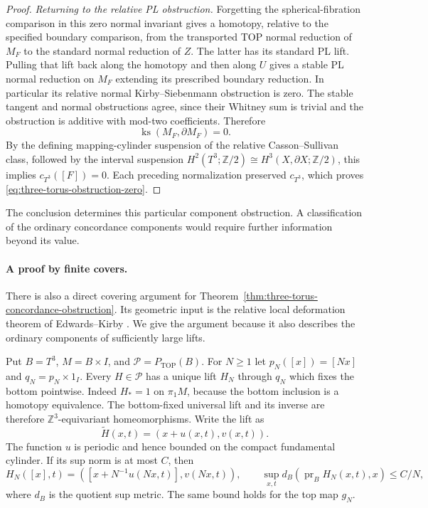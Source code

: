 \begin{proof}
\emph{Returning to the relative PL obstruction.}
Forgetting the spherical-fibration comparison in this
zero normal invariant gives a homotopy, relative to the
specified boundary comparison, from the transported
TOP normal reduction of $M_F$ to the standard normal
reduction of $Z$.  The latter has its standard PL lift.
Pulling that lift back along the homotopy and then along
$U$ gives a stable PL normal reduction on $M_F$ extending
its prescribed boundary reduction.  In particular its
relative normal Kirby--Siebenmann obstruction is zero.
The stable tangent and normal obstructions agree, since
their Whitney sum is trivial and the obstruction is
additive with mod-two coefficients.  Therefore
\[
 \operatorname{ks}(M_F,\partial M_F)=0.
\]
By the defining mapping-cylinder suspension of the
relative Casson--Sullivan class, followed by the interval
suspension $H^2(T^3;\mathbb Z/2)\cong
H^3(X,\partial X;\mathbb Z/2)$, this implies
$c_{T^3}([F])=0$.  Each preceding normalization preserved
$c_{T^3}$, which proves
\eqref{eq:three-torus-obstruction-zero}.
\end{proof}

The conclusion determines this particular component
obstruction.  A classification of the ordinary concordance
components would require further information beyond its value.

\paragraph{A proof by finite covers.}
There is also a direct covering argument for
Theorem~\ref{thm:three-torus-concordance-obstruction}.  Its geometric
input is the relative local deformation theorem of Edwards--Kirby
\cite[Theorem~5.1(1)--(2) and its boundary-pair Note, p.~70;
proof of Corollary~1.1, p.~77]{EdwardsKirby1971}.
We give the argument because it also describes the ordinary components
of sufficiently large lifts.

Put $B=T^3$, $M=B\times I$, and
$\mathcal P=P_{\mathrm{TOP}}(B)$.  For $N\geq1$ let
$p_N([x])=[Nx]$ and $q_N=p_N\times1_I$.
Every $H\in\mathcal P$ has a unique lift $H_N$ through $q_N$
which fixes the bottom pointwise.  Indeed $H_*=1$ on
$\pi_1M$, because the bottom inclusion is a homotopy equivalence.
The bottom-fixed universal lift and its inverse are therefore
$\mathbb Z^3$-equivariant homeomorphisms.  Write the lift as
\[
 \widetilde H(x,t)=(x+u(x,t),v(x,t)).
\]
The function $u$ is periodic and hence bounded on the compact
fundamental cylinder.  If its sup norm is at most $C$, then
\begin{equation}\label{eq:three-torus-cover-displacement}
 H_N([x],t)=
 \left([x+N^{-1}u(Nx,t)],v(Nx,t)\right),
 \qquad
 \sup_{x,t}d_B(\operatorname{pr}_BH_N(x,t),x)\leq C/N,
\end{equation}
where $d_B$ is the quotient sup metric.
The same bound holds for the top map $g_N$.

